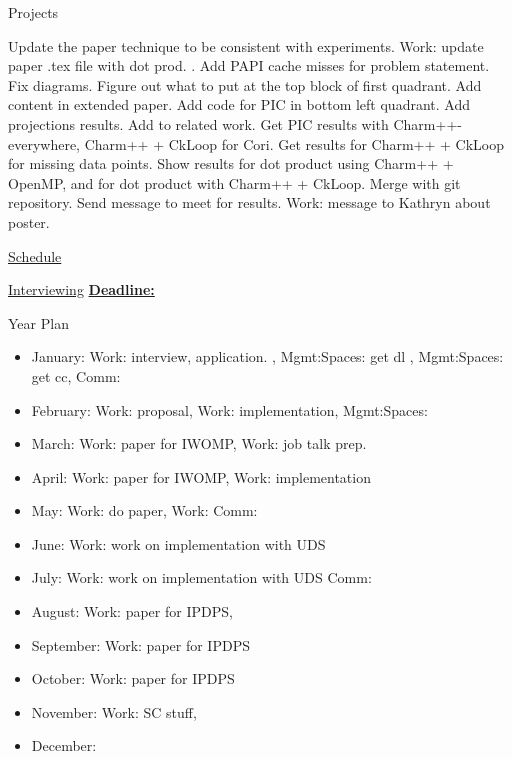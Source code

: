 \begin{columns}
\begin{column}{0.10\linewidth}
\begin{block}{Projects}
\begin{enumerate}
\ptask Update the paper technique to be consistent with experiments.  
\ptask Work: update paper .tex file with dot prod. .
\ptask Add PAPI cache misses for problem statement.
\ptask Fix diagrams.
\ptask Figure out what to put at the top block of first quadrant.
\ptask Add content in extended paper.
\ptask Add code for PIC in bottom left quadrant.
\ptask Add projections results.
\ptask Add to related work.
\ptask Get PIC results with Charm++-everywhere, Charm++ + CkLoop for Cori.
\ptask Get results for Charm++ + CkLoop for missing data points.
\ptask Show results for dot product using Charm++ + OpenMP, and for
dot product with Charm++ + CkLoop.
\pitem Merge with git repository.
\pitem Send message to meet for results.
\pitem Work: message to Kathryn about poster.
\end{enumerate}

\underline{Schedule} \\ 
\begin{enumerate}
\pitem 
\end{enumerate} 
\end{block} 

\underline{Interviewing} 
\underline{\textbf{Deadline:}} 
\begin{enumerate}
\pitem 
\pitem 
\end{enumerate} 



\begin{block}{Year Plan}
\begin{itemize}
\tiny \item \tiny January: Work: interview, application. , Mgmt:Spaces: get dl , Mgmt:Spaces: get cc, Comm: 
\item \tiny February: Work: proposal, Work: implementation, Mgmt:Spaces: 
\item \tiny March: Work: paper for IWOMP, Work: job talk prep.
\item \tiny April: Work: paper for IWOMP, Work: implementation  
\item \tiny May: Work: do paper, Work: Comm: 
\item \tiny June: Work: work on implementation with UDS 
\item \tiny July: Work: work on implementation with UDS Comm:  
\item \tiny August: Work: paper for IPDPS, 
\item \tiny September: Work: paper for IPDPS 
\item \tiny October: Work: paper for IPDPS  
\item \tiny November: Work: SC stuff, 
\item \tiny December: 
\end{itemize} 
\end{block}


\end{column}
\end{columns}
